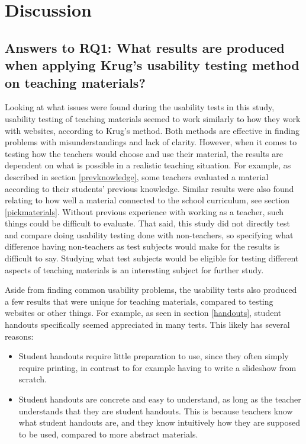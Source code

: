 \chapter{Discussion}

\section{Answers to RQ1: What results are produced when applying Krug's usability testing method on teaching materials?}

Looking at what issues were found during the usability tests in this study, usability testing of teaching materials seemed to work similarly to how they work with websites, according to Krug's method. Both methods are effective in finding problems with misunderstandings and lack of clarity. However, when it comes to testing how the teachers would choose and use their material, the results are dependent on what is possible in a realistic teaching situation. For example, as described in section \ref{prevknowledge}, some teachers evaluated a material according to their students' previous knowledge. Similar results were also found relating to how well a material connected to the school curriculum, see section \ref{pickmaterials}. Without previous experience with working as a teacher, such things could be difficult to evaluate. That said, this study did not directly test and compare doing usability testing done with non-teachers, so specifying what difference having non-teachers as test subjects would make for the results is difficult to say. Studying what test subjects would be eligible for testing different aspects of teaching materials is an interesting subject for further study.

Aside from finding common usability problems, the usability tests also produced a few results that were unique for teaching materials, compared to testing websites or other things. For example, as seen in section \ref{handouts}, student handouts specifically seemed appreciated in many tests. This likely has several reasons:

\begin{itemize}
	\item Student handouts require little preparation to use, since they often simply require printing, in contrast to for example having to write a slideshow from scratch.
	\item Student handouts are concrete and easy to understand, as long as the teacher understands that they are student handouts. This is because teachers know what student handouts are, and they know intuitively how they are supposed to be used, compared to more abstract materials.
\end{itemize}

